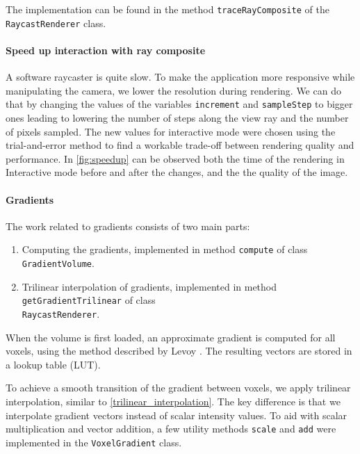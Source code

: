 \documentclass[a4paper]{article}
\begin{document}
The implementation can be found in the method {\tt traceRayComposite} of the {\tt RaycastRenderer} class.

\paragraph{Speed up interaction with ray composite}
\label{speed_up}

A software raycaster is quite slow. To make the application more responsive while manipulating the camera, we lower the resolution during rendering. We can do that by changing the values of the variables {\tt increment} and {\tt sampleStep} to bigger ones leading to lowering the number of steps along the view ray and the number of pixels sampled.  The new values for interactive mode were chosen using the trial-and-error method to find a workable trade-off between rendering quality and performance. In \autoref{fig:speedup} can be observed both the time of the rendering in Interactive mode before and after the changes, and the the quality of the image.

\paragraph{Gradients}
\label{subsec:gradients}

The work related to gradients consists of two main parts:

\begin{enumerate}[noitemsep]
  \item Computing the gradients, implemented in method {\tt compute} of class {\tt GradientVolume}.
  \item Trilinear interpolation of gradients, implemented in method {\tt getGradientTrilinear} of class\\ {\tt RaycastRenderer}.
\end{enumerate}

\noindent When the volume is first loaded, an approximate gradient is computed for all voxels, using the method described by Levoy \citep{levoy_1988}. The resulting vectors are stored in a lookup table (LUT).

To achieve a smooth transition of the gradient between voxels, we apply trilinear interpolation, similar to \autoref{trilinear_interpolation}. The key difference is that we interpolate gradient vectors instead of scalar intensity values. To aid with scalar multiplication and vector addition, a few utility methods {\tt scale} and {\tt add} were implemented in the {\tt VoxelGradient} class.
\end{document}
